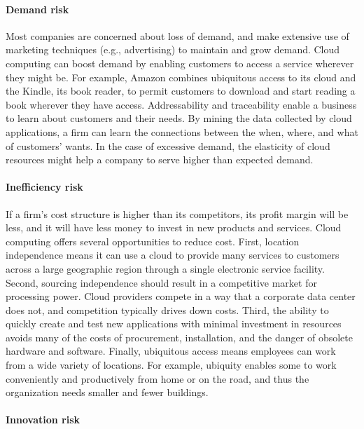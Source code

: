 \documentclass[
]{article}
\begin{document}
\hypertarget{demand-risk}{%
\paragraph*{Demand risk}\label{demand-risk}}

Most companies are concerned about loss of demand, and make extensive
use of marketing techniques (e.g., advertising) to maintain and grow
demand. Cloud computing can boost demand by enabling customers to access
a service wherever they might be. For example, Amazon combines
ubiquitous access to its cloud and the Kindle, its book reader, to
permit customers to download and start reading a book wherever they have
access. Addressability and traceability enable a business to learn about
customers and their needs. By mining the data collected by cloud
applications, a firm can learn the connections between the when, where,
and what of customers' wants. In the case of excessive demand, the
elasticity of cloud resources might help a company to serve higher than
expected demand.

\hypertarget{inefficiency-risk}{%
\paragraph*{Inefficiency risk}\label{inefficiency-risk}}

If a firm's cost structure is higher than its competitors, its profit
margin will be less, and it will have less money to invest in new
products and services. Cloud computing offers several opportunities to
reduce cost. First, location independence means it can use a cloud to
provide many services to customers across a large geographic region
through a single electronic service facility. Second, sourcing
independence should result in a competitive market for processing power.
Cloud providers compete in a way that a corporate data center does not,
and competition typically drives down costs. Third, the ability to
quickly create and test new applications with minimal investment in
resources avoids many of the costs of procurement, installation, and the
danger of obsolete hardware and software. Finally, ubiquitous access
means employees can work from a wide variety of locations. For example,
ubiquity enables some to work conveniently and productively from home or
on the road, and thus the organization needs smaller and fewer
buildings.

\hypertarget{innovation-risk}{%
\paragraph*{Innovation risk}\label{innovation-risk}}
\end{document}
